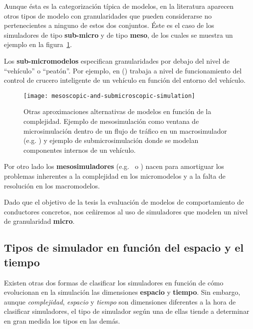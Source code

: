 Aunque ésta es la categorización típica de modelos, en la literatura aparecen otros tipos de modelo con granularidades que pueden considerarse no pertenecientes a ninguno de estos dos conjuntos. Éste es el caso de los simuladores de tipo \textbf{sub-micro} y de tipo \textbf{meso}, de los cuales se muestra un ejemplo en la figura~\ref{fig:mesoscopic-and-submicroscopic-simulation}.

Los \textbf{sub-micromodelos} especifican granularidades por debajo del nivel de \enquote{vehículo} o \enquote{peatón}. Por ejemplo, en (\cite{Minderhoud1999}) trabaja a nivel de funcionamiento del control de crucero inteligente de un vehículo en función del entorno del vehículo.

\begin{figure}
	\centering
	\texttt{[image: mesoscopic-and-submicroscopic-simulation]}
	\caption[Alternativas a la clasificación por granularidad]{Otras aproximaciones alternativas de modelos en función de la complejidad. Ejemplo de mesosimulación como ventana de microsimulación dentro de un flujo de tráfico en un macrosimulador (e.g. \cite{munoz2001integrated}) y ejemplo de submicrosimulación donde se modelan componentes internos de un vehículo.}
	\label{fig:mesoscopic-and-submicroscopic-simulation}
\end{figure}

Por otro lado los \textbf{mesosimuladores} (e.g.~\cite{munoz2001integrated} o \cite{casas2011need}) nacen para amortiguar los problemas inherentes a la complejidad en los micromodelos y a la falta de resolución en los macromodelos.

Dado que el objetivo de la tesis la evaluación de modelos de comportamiento de conductores concretos, nos ceñiremos al uso de simuladores que modelen un nivel de granularidad \textbf{micro}.

\subsection{Tipos de simulador en función del espacio y el tiempo}

Existen otras dos formas de clasificar los simuladores en función de cómo evolucionan en la simulación las dimensiones \textbf{espacio} y  \textbf{tiempo}. Sin embargo, aunque \textit{complejidad}, \textit{espacio} y \textit{tiempo} son dimensiones diferentes a la hora de clasificar simuladores, el tipo de simulador según una de ellas tiende a determinar en gran medida los tipos en las demás.

